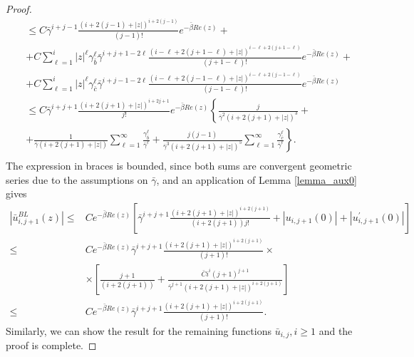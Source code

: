 \documentclass[10pt,a4paper]{amsart}
\begin{document}
\begin{proof}
$$\begin{aligned}
& \leq C \bar{\gamma}^{i+j-1} \frac{(i+2(j-1)+|z|)^{i+2(j-1)}}{(j-1)!} e^{-\bar{\beta} R e(z)}+ \\
& +C \sum_{\ell=1}^i|z|^{\ell} \gamma_{\bar{b}}^{\ell} \bar{\gamma}^{i+j+1-2 \ell} \frac{(i-\ell+2(j+1-\ell)+|z|)^{i-\ell+2(j+1-\ell)}}{(j+1-\ell)!} e^{-\bar{\beta} R e(z)}+ \\
& +C \sum_{\ell=1}^i|z|^{\ell} \gamma_{\bar{c}}^{\ell} \bar{\gamma}^{i+j-1-2 \ell} \frac{(i-\ell+2(j-1-\ell)+|z|)^{i-\ell+2(j-1-\ell)}}{(j-1-\ell)!} e^{-\bar{\beta} R e(z)} \\
& \leq C \bar{\gamma}^{i+j+1} \frac{(i+2(j+1)+|z|)^{i+2 j+1}}{j!} e^{-\bar{\beta} R e(z)}\left\{\frac{j}{\bar{\gamma}^2(i+2(j+1)+|z|)^3}+\right. \\
& \left.+\frac{1}{\bar{\gamma}(i+2(j+1)+|z|)} \sum_{\ell=1}^{\infty} \frac{\gamma_{\bar{b}}^{\ell}}{\bar{\gamma}^{\ell}}+\frac{j(j-1)}{\bar{\gamma}^3(i+2(j+1)+|z|)^5} \sum_{\ell=1}^{\infty} \frac{\gamma_{\bar{c}}^{\ell}}{\bar{\gamma}^{\ell}}\right\} . \\
&
\end{aligned}
$$
%
The expression in braces is bounded, since both sums are convergent geometric series due to the assumptions on $\bar{\gamma}$, and an application of Lemma \ref{lemma_aux0} gives
%
$$
\begin{aligned}
\left|\bar{u}_{i, j+1}^{B L}(z)\right| \leq & C e^{-\bar{\beta} R e(z)}\left[\bar{\gamma}^{i+j+1} \frac{(i+2(j+1)+|z|)^{i+2(j+1)}}{(i+2(j+1)) j!}+\left|u_{i, j+1}(0)\right|+\left|u_{i, j+1}^{\prime}(0)\right|\right] \\
\leq & C e^{-\bar{\beta} R e(z)} \bar{\gamma}^{i+j+1} \frac{(i+2(j+1)+|z|)^{i+2(j+1)}}{(j+1)!} \times \\
& \times\left[\frac{j+1}{(i+2(j+1))}+\frac{\bar{C} i^i(j+1)^{j+1}}{\bar{\gamma}^{j+1}(i+2(j+1)+|z|)^{i+2(j+1)}}\right] \\
\leq & C e^{-\bar{\beta} R e(z)} \bar{\gamma}^{i+j+1} \frac{(i+2(j+1)+|z|)^{i+2(j+1)}}{(j+1)!} .
\end{aligned}
$$
%
Similarly, we can show the result for the remaining functions $\bar{u}_{i,j},i \geq 1$ and the proof is complete.
\end{proof}
\end{document}

